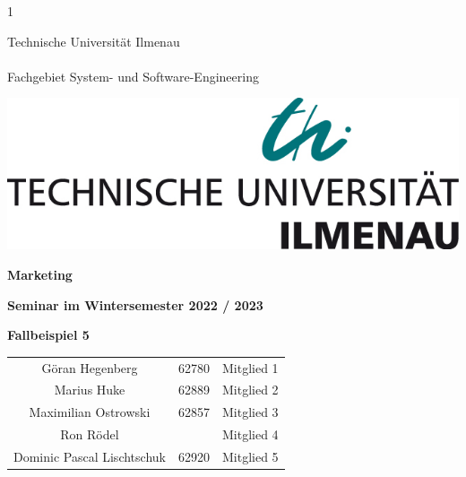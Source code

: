1\begin{titlepage}
    
    \begin{minipage}[b]{0.625\textwidth}
      Technische Universität Ilmenau\\
      \\
      Fachgebiet System- und Software-Engineering
    \end{minipage}%
    \hfill
    \begin{minipage}[b]{0.375\textwidth}
      \begin{flushright}
        \includegraphics[width=\textwidth]{tu_logo.jpg}
      \end{flushright}
    \end{minipage}
    \vspace*{12\baselineskip}
    
    \begin{centering}
    {\huge \textbf{Marketing}}\\
    \vspace*{1\baselineskip}
    
    {\large \textbf{Seminar im Wintersemester 2022 / 2023}}\\
    \vspace*{9\baselineskip}
    
    {\LARGE \textbf{Fallbeispiel 5}}\\
    \vspace*{1\baselineskip}
    
    \begin{center}
        \large
        \begin{tabular}{ccc}
            Göran Hegenberg & 62780 & Mitglied 1 \\
            Marius Huke & 62889 & Mitglied 2 \\
            Maximilian Ostrowski & 62857 & Mitglied 3 \\
            Ron Rödel & & Mitglied 4 \\
            Dominic Pascal Lischtschuk & 62920 & Mitglied 5 \\
        \end{tabular}
    \end{center}
    \end{centering}
    
    \restoregeometry
    \end{titlepage}
    
    
    
    \tableofcontents
    \thispagestyle{empty} %
    \pagebreak %